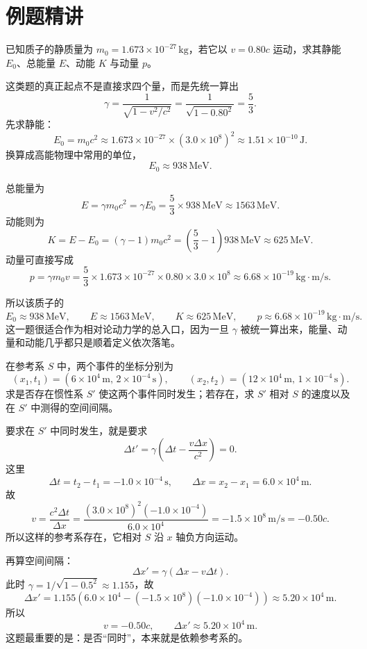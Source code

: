 \documentclass[lang=cn,11pt]{elegantbook}
\begin{document}
\section{例题精讲}

\begin{example}
已知质子的静质量为 \(m_0=1.673\times 10^{-27}\,\mathrm{kg}\)，若它以 \(v=0.80c\) 运动，求其静能 \(E_0\)、总能量 \(E\)、动能 \(K\) 与动量 \(p\)。
\end{example}

\begin{solution}
这类题的真正起点不是直接求四个量，而是先统一算出
\[
\gamma=\frac{1}{\sqrt{1-v^2/c^2}}
=\frac{1}{\sqrt{1-0.80^2}}
=\frac{5}{3}.
\]
先求静能：
\[
E_0=m_0c^2
\approx 1.673\times 10^{-27}\times (3.0\times 10^8)^2
\approx 1.51\times 10^{-10}\,\mathrm{J}.
\]
换算成高能物理中常用的单位，
\[
E_0\approx 938\,\mathrm{MeV}.
\]

总能量为
\[
E=\gamma m_0c^2=\gamma E_0
=\frac53\times 938\,\mathrm{MeV}
\approx 1563\,\mathrm{MeV}.
\]
动能则为
\[
K=E-E_0=(\gamma-1)m_0c^2
=\left(\frac53-1\right)938\,\mathrm{MeV}
\approx 625\,\mathrm{MeV}.
\]
动量可直接写成
\[
p=\gamma m_0v
=\frac53\times 1.673\times 10^{-27}\times 0.80\times 3.0\times 10^8
\approx 6.68\times 10^{-19}\,\mathrm{kg\cdot m/s}.
\]

所以该质子的
\[
\boxed{E_0\approx 938\,\mathrm{MeV},\qquad E\approx 1563\,\mathrm{MeV},\qquad K\approx 625\,\mathrm{MeV},\qquad p\approx 6.68\times 10^{-19}\,\mathrm{kg\cdot m/s}.}
\]
这一题很适合作为相对论动力学的总入口，因为一旦 \(\gamma\) 被统一算出来，能量、动量和动能几乎都只是顺着定义依次落笔。
\end{solution}

\begin{example}[另一参考系中两事件为何会同时发生]
在参考系 \(S\) 中，两个事件的坐标分别为
\[
(x_1,t_1)=(6\times 10^4\,\mathrm{m},\,2\times 10^{-4}\,\mathrm{s}),
\qquad
(x_2,t_2)=(12\times 10^4\,\mathrm{m},\,1\times 10^{-4}\,\mathrm{s}).
\]
求是否存在惯性系 \(S'\) 使这两个事件同时发生；若存在，求 \(S'\) 相对 \(S\) 的速度以及在 \(S'\) 中测得的空间间隔。
\end{example}

\begin{solution}
要求在 \(S'\) 中同时发生，就是要求
\[
\Delta t'=\gamma\left(\Delta t-\frac{v\Delta x}{c^2}\right)=0.
\]
这里
\[
\Delta t=t_2-t_1=-1.0\times 10^{-4}\,\mathrm{s},
\qquad
\Delta x=x_2-x_1=6.0\times 10^4\,\mathrm{m}.
\]
故
\[
v=\frac{c^2\Delta t}{\Delta x}
=\frac{(3.0\times 10^8)^2(-1.0\times 10^{-4})}{6.0\times 10^4}
=-1.5\times 10^8\,\mathrm{m/s}
=-0.50c.
\]
所以这样的参考系存在，它相对 \(S\) 沿 \(x\) 轴负方向运动。

再算空间间隔：
\[
\Delta x'=\gamma(\Delta x-v\Delta t).
\]
此时 \(\gamma=1/\sqrt{1-0.5^2}\approx 1.155\)，故
\[
\Delta x'
=1.155\left(6.0\times 10^4-(-1.5\times 10^8)(-1.0\times 10^{-4})\right)
\approx 5.20\times 10^4\,\mathrm{m}.
\]
所以
\[
\boxed{v=-0.50c,\qquad \Delta x'\approx 5.20\times 10^4\,\mathrm{m}.}
\]
这题最重要的是：是否“同时”，本来就是依赖参考系的。
\end{solution}
\end{document}
